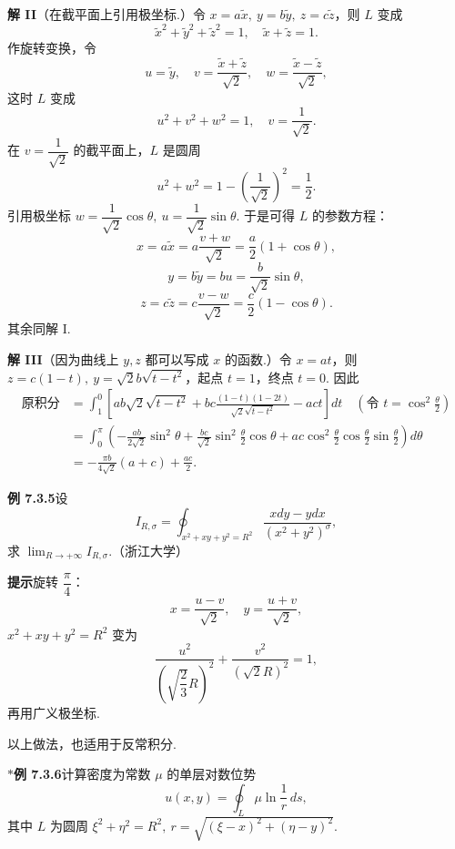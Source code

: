 \documentclass[UTF8,12pt,a4paper,fontset=fandol]{ctexart}
\begin{document}
\noindent\textbf{解 II}\quad （在截平面上引用极坐标.）令 $x=a\tilde x,\ y=b\tilde y,\ z=c\tilde z$，则 $L$ 变成
\[
\tilde x^2+\tilde y^2+\tilde z^2=1,\quad \tilde x+\tilde z=1.
\]
作旋转变换，令
\[
u=\tilde y,\quad v=\frac{\tilde x+\tilde z}{\sqrt2},\quad
w=\frac{\tilde x-\tilde z}{\sqrt2},
\]
这时 $L$ 变成
\[
u^2+v^2+w^2=1,\quad v=\frac1{\sqrt2}.
\]
在 $v=\dfrac1{\sqrt2}$ 的截平面上，$L$ 是圆周
\[
u^2+w^2=1-\left(\frac1{\sqrt2}\right)^2=\frac12.
\]
引用极坐标 $w=\dfrac1{\sqrt2}\cos\theta,\ u=\dfrac1{\sqrt2}\sin\theta$. 于是可得 $L$ 的参数方程：
\[
x=a\tilde x=a\frac{v+w}{\sqrt2}=\frac a2(1+\cos\theta),
\]
\[
y=b\tilde y=bu=\frac b{\sqrt2}\sin\theta,
\]
\[
z=c\tilde z=c\frac{v-w}{\sqrt2}=\frac c2(1-\cos\theta).
\]
其余同解 I.

\noindent\textbf{解 III}\quad （因为曲线上 $y,z$ 都可以写成 $x$ 的函数.）令 $x=at$，则 $z=c(1-t),\ y=\sqrt2b\sqrt{t-t^2}$，起点 $t=1$，终点 $t=0$. 因此
\[
\begin{aligned}
\text{原积分}
&=\int_1^0\left[ab\sqrt2\sqrt{t-t^2}
+bc\frac{(1-t)(1-2t)}{\sqrt2\sqrt{t-t^2}}-act\right]dt
\quad\left(\text{令 }t=\cos^2\frac\theta2\right)\\
&=\int_0^\pi\left(-\frac{ab}{2\sqrt2}\sin^2\theta
+\frac{bc}{\sqrt2}\sin^2\frac\theta2\cos\theta
+ac\cos^2\frac\theta2\cos\frac\theta2\sin\frac\theta2\right)d\theta\\
&=-\frac{\pi b}{4\sqrt2}(a+c)+\frac{ac}{2}.
\end{aligned}
\]

\noindent\textbf{例 7.3.5}\quad 设
\[
I_{R,\sigma}=\oint_{x^2+xy+y^2=R^2}
\frac{xdy-ydx}{(x^2+y^2)^\sigma},
\]
求 $\displaystyle\lim_{R\to+\infty}I_{R,\sigma}$.（浙江大学）

\noindent\textbf{提示}\quad 旋转 $\dfrac\pi4$：
\[
x=\frac{u-v}{\sqrt2},\quad y=\frac{u+v}{\sqrt2},
\]
$x^2+xy+y^2=R^2$ 变为
\[
\frac{u^2}{\left(\sqrt{\dfrac23}R\right)^2}
+\frac{v^2}{(\sqrt2R)^2}=1,
\]
再用广义极坐标.

以上做法，也适用于反常积分.

\noindent\textbf{$*$例 7.3.6}\quad 计算密度为常数 $\mu$ 的单层对数位势
\[
u(x,y)=\oint_L\mu\ln\frac1r\,ds,
\]
其中 $L$ 为圆周 $\xi^2+\eta^2=R^2,\ r=\sqrt{(\xi-x)^2+(\eta-y)^2}$.
\end{document}
